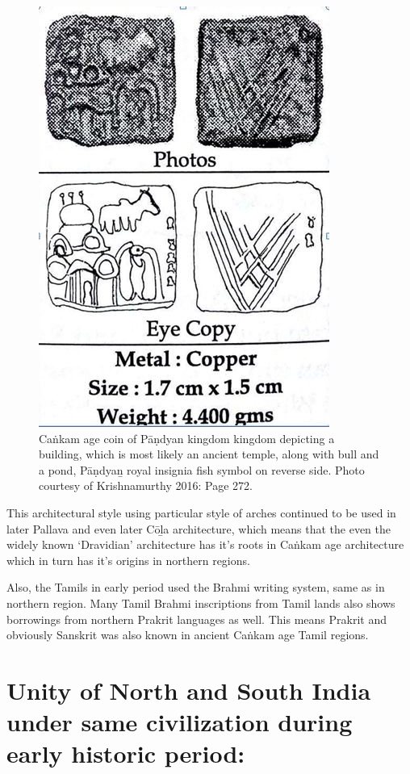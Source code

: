 \begin{figure}[!htbp]
\includegraphics{"images/article-05/art05-fig11.jpg"}
\caption{Caṅkam age coin of Pāṇdyan kingdom kingdom depicting a building, which is most likely an ancient temple, along with bull and a pond, Pāṇdyaṉ royal insignia fish symbol on reverse side. Photo courtesy of Krishnamurthy 2016: Page 272.}\label{art5-fig11}
\end{figure}

This architectural style using particular style of arches continued to be used in later Pallava and even later Cōḻa architecture, which means that the even the widely known ‘Dravidian’ architecture has it’s roots in Caṅkam age architecture which in turn has it’s origins in northern regions.

Also, the Tamils in early period used the Brahmi writing system, same as in northern region. Many Tamil Brahmi inscriptions from Tamil lands also shows borrowings from northern Prakrit languages as well. This means Prakrit and obviously Sanskrit was also known in ancient Caṅkam age Tamil regions.


\section*{Unity of North and South India under same civilization during early historic period:}

